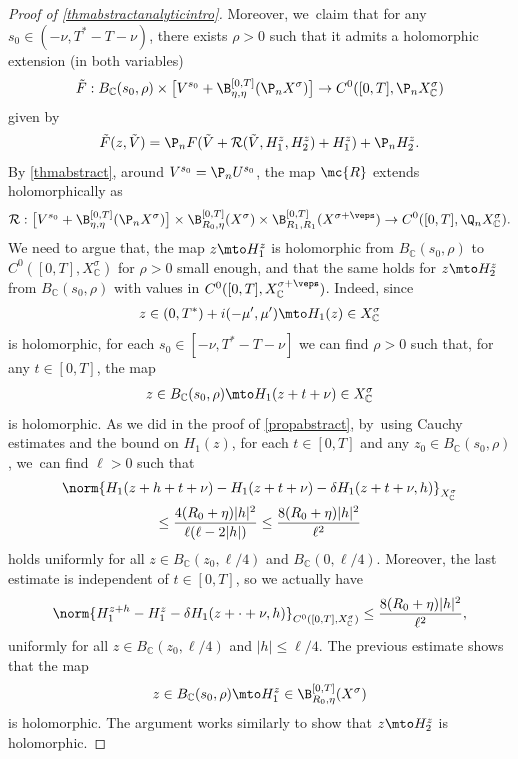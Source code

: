\begin{proof}[Proof of \cref{thmabstractanalyticintro}]
Moreover, we~claim that for any $s_0\in (-\nu,T^*-T-\nu)$, there exists $\rho>0$ such that it admits a holomorphic extension (in both variables)
\begin{align*}
\Tilde{F}: B_{\mathbb{C}}(s_0, \rho)\times \bigl[V^{s_0}+\B_{\eta,\eta}^{[0,T]}(\P_n X^{\sigma})\bigr]\to C^0([0, T], \P_n X_\mathbb{C}^\sigma)
\end{align*}
given by
\begin{align*}
\Tilde{F}(z,\Tilde{V})=\P_n F(\Tilde{V}+\mathcal{R}(\Tilde{V},H_{1}^z,H_{2}^z)+H_{1}^z)+\P_n H_{2}^z.
\end{align*}
By \cref{thmabstract}, around $V^{s_0}=\P_n U^{s_0}$, the map $\mc{R}$ extends holomorphically as
\begin{align*}
\mathcal{R}: \bigl[ V^{s_0}+ \B_{\eta,\eta}^{[0,T]}(\P_n X^{\sigma})\bigr] \times \B_{R_{0},\eta}^{[0,T]}(X^{\sigma}) \times \B_{R_{1},R_{1}}^{[0,T]}(X^{\sigma+\veps}) \to C^0([0, T], \Q_{n }X_\mathbb{C}^{\sigma}).
\end{align*}
We need to argue that, the map $z\mto H_1^z$ is holomorphic from $B_{\mathbb{C}}(s_0, \rho)$ to $C^0([0, T], X_\mathbb{C}^\sigma)$ for $\rho>0$ small enough, and that the same holds for $z\mto H_2^z$ from $B_{\mathbb{C}}(s_0, \rho)$ with values in $C^0([0, T], X_\mathbb{C}^{\sigma+\veps})$. Indeed, since
\begin{align*}
z\in (0, T^*)+i(-\mu', \mu')\mto H_1(z)\in X_\mathbb{C}^\sigma
\end{align*}
is holomorphic, for each $s_0\in [-\nu, T^*-T-\nu]$ we can find $\rho>0$ such that, for any $t\in [0, T]$, the map
\begin{align*}
z\in B_\mathbb{C}(s_0, \rho)\mto H_1(z+t+\nu)\in X_\mathbb{C}^\sigma
\end{align*}
is holomorphic. As we did in the proof of \cref{propabstract}, by~using Cauchy estimates and the bound on $H_1(z)$, for each $t\in [0, T]$ and any $z_0\in B_\mathbb{C}(s_0, \rho)$, we~can find $\ell>0$ such that
\begin{multline*}
\norm{H_1(z+h+t+\nu)-H_1(z+t+\nu)-\delta H_1(z+t+\nu, h)}_{X_\mathbb{C}^\sigma}\\
\leq \dfrac{4(R_0+\eta)|h|^2}{\ell(\ell-2|h|)}\leq \dfrac{8(R_0+\eta)|h|^2}{\ell^2}
\end{multline*}
holds uniformly for all $z\in B_\mathbb{C}(z_0, \ell/4)$ and $B_\mathbb{C}(0, \ell/4)$. Moreover, the last estimate is independent of $t\in [0, T]$, so we actually have
\begin{align*}
\norm{H_1^{z+h}-H_1^z-\delta H_1(z+\cdot+\nu, h)}_{C^0([0, T], X_\mathbb{C}^\sigma)}\leq \dfrac{8(R_0+\eta)|h|^2}{\ell^2},
\end{align*}
uniformly for all $z\in B_\mathbb{C}(z_0, \ell/4)$ and $|h|\leq \ell/4$. The previous estimate shows that the map
\begin{align*}
z\in B_\mathbb{C}(s_0, \rho)\mto H_1^z\in \B_{R_0, \eta}^{[0, T]}(X^\sigma)
\end{align*}
is holomorphic. The argument works similarly to show that $z\mto H_2^z$ is holomorphic.


\end{proof}
